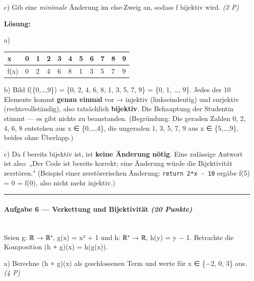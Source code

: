 \documentclass[11pt, a4paper]{article}
\begin{document}
c) Gib eine \textit{minimale} Änderung im else-Zweig an, sodass f bijektiv wird. \textit{(2 P)}


\textbf{Lösung:}


a)



\begin{landscape}

{\scriptsize
\begin{tabularx}{\linewidth}{XXXXXXXXXXX}
\hline
\rowcolor{tableheadbg}
{\color{white}\textbf{x}} & {\color{white}\textbf{0}} & {\color{white}\textbf{1}} & {\color{white}\textbf{2}} & {\color{white}\textbf{3}} & {\color{white}\textbf{4}} & {\color{white}\textbf{5}} & {\color{white}\textbf{6}} & {\color{white}\textbf{7}} & {\color{white}\textbf{8}} & {\color{white}\textbf{9}} \\[2pt]
\hline
\endhead
\hline
\endfoot
f(x) & 0 & 2 & 4 & 6 & 8 & 1 & 3 & 5 & 7 & 9 \\
\end{tabularx}
}
\end{landscape}


b) Bild f(\{0,…,9\}) = \{0, 2, 4, 6, 8, 1, 3, 5, 7, 9\} = \{0, 1, …, 9\}. Jedes der 10 Elemente kommt \textbf{genau einmal} vor → injektiv (linkseindeutig) und surjektiv (rechtsvollständig), also tatsächlich \textbf{bijektiv}. Die Behauptung der Studentin stimmt — es gibt nichts zu beanstanden. (Begründung: Die geraden Zahlen 0, 2, 4, 6, 8 entstehen aus x ∈ \{0,…,4\}, die ungeraden 1, 3, 5, 7, 9 aus x ∈ \{5,…,9\}, beides ohne Überlapp.)


c) Da f bereits bijektiv ist, ist \textbf{keine Änderung nötig}. Eine zulässige Antwort ist also: „Der Code ist bereits korrekt; eine Änderung würde die Bijektivität zerstören." (Beispiel einer zerstörerischen Änderung: \texttt{return 2*x - 10} ergäbe f(5) = 0 = f(0), also nicht mehr injektiv.)



\noindent\textcolor{rulegray}{\rule{\linewidth}{0.4pt}}


\paragraph{Aufgabe 6 — Verkettung und Bijektivität \textit{(20 Punkte)}}\mbox{}\\[2pt]

Seien g: ℝ → ℝ⁺, g(x) = x² + 1 und h: ℝ⁺ → ℝ, h(y) = y − 1. Betrachte die Komposition (h ∘ g)(x) = h(g(x)).


a) Berechne (h ∘ g)(x) als geschlossenen Term und werte für x ∈ \{−2, 0, 3\} aus. \textit{(4 P)}
\end{document}
